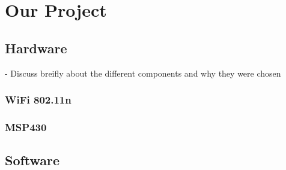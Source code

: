 \documentclass[journal,transmag]{IEEEtran}
\begin{document}
\section{Our Project}

\subsection{Hardware}
 \-- Discuss breifly about the different components and why they were chosen \\

\subsubsection{WiFi 802.11n \\}
\subsubsection{MSP430 \\}

\subsection{Software}
\end{document}
